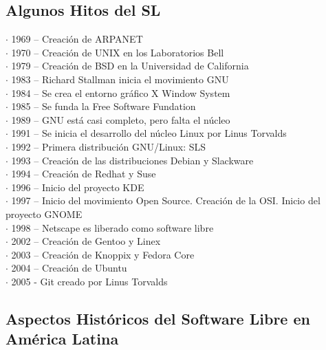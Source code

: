 \documentclass{book}
\begin{document}
\subsection{Algunos Hitos del SL}

\begin{description}
\item[$\cdot$ 1969 – Creación de ARPANET]
\item[$\cdot$ 1970 – Creación de UNIX en los Laboratorios Bell]
\item[$\cdot$ 1979 – Creación de BSD en la Universidad de California]
\item[$\cdot$ 1983 – Richard Stallman inicia el movimiento GNU]
\item[$\cdot$ 1984 – Se crea el entorno gráfico X Window System]
\item[$\cdot$ 1985 – Se funda la Free Software Fundation]
\item[$\cdot$ 1989 – GNU está casi completo, pero falta el núcleo]
\item[$\cdot$ 1991 – Se inicia el desarrollo del núcleo Linux por Linus Torvalds]
\item[$\cdot$ 1992 – Primera distribución GNU/Linux: SLS]
\item[$\cdot$ 1993 – Creación de las distribuciones Debian y Slackware]
\item[$\cdot$ 1994 – Creación de Redhat y Suse]
\item[$\cdot$ 1996 – Inicio del proyecto KDE]
\item[$\cdot$ 1997 – Inicio del movimiento Open Source. Creación de la OSI. Inicio del proyecto GNOME]
\item[$\cdot$ 1998 – Netscape es liberado como software libre]
\item[$\cdot$ 2002 – Creación de Gentoo y Linex]
\item[$\cdot$ 2003 – Creación de Knoppix y Fedora Core]
\item[$\cdot$ 2004 – Creación de Ubuntu]
\item[$\cdot$ 2005 - Git creado por Linus Torvalds]
\end{description}


\subsection{Aspectos Históricos del Software Libre en América Latina}
\end{document}
